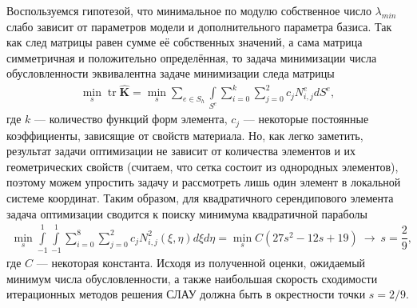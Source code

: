 Воспользуемся гипотезой, что минимальное по модулю собственное число $\lambda_{min}$ слабо зависит от параметров модели и дополнительного параметра базиса. Так как след матрицы равен сумме её собственных значений, а сама матрица симметричная и положительно определённая, то задача минимизации числа обусловленности эквивалентна задаче минимизации следа матрицы
\begin{gather*}
    \min\limits_s \operatorname{tr} \widehat{\mathbf{K}} =
    \min\limits_s \sum\limits_{e \in S_h} \int\limits_{S^e} \sum\limits_{i = 0}^k \sum\limits_{j = 0}^2 c_{j} N^e_{i,j} d S^e,
\end{gather*}
где $k$ --- количество функций форм элемента, $c_{j}$ --- некоторые постоянные коэффициенты, зависящие от свойств материала. Но, как легко заметить, результат задачи оптимизации не зависит от количества элементов и их геометрических свойств (считаем, что сетка состоит из однородных элементов), поэтому можем упростить задачу и рассмотреть лишь один элемент в локальной системе координат. Таким образом, для квадратичного серендипового элемента задача оптимизации сводится к поиску минимума квадратичной параболы
\begin{gather}
	\label{eq:ParamSOptimal}
	\min\limits_s \int\limits_{-1}^{1} \int\limits_{-1}^{1} \sum\limits_{i = 0}^8 \sum\limits_{j = 0}^2 c_{j} N_{i, j}^2(\xi, \eta) d\xi d\eta =
	\min\limits_s C (27 s^2 -12 s + 19) \
	\rightarrow \ s = \dfrac{2}{9},
\end{gather}
где $C$ --- некоторая константа. Исходя из полученной оценки, ожидаемый минимум числа обусловленности, а также наибольшая скорость сходимости итерационных методов решения СЛАУ должна быть в окрестности точки $s = 2/9$.